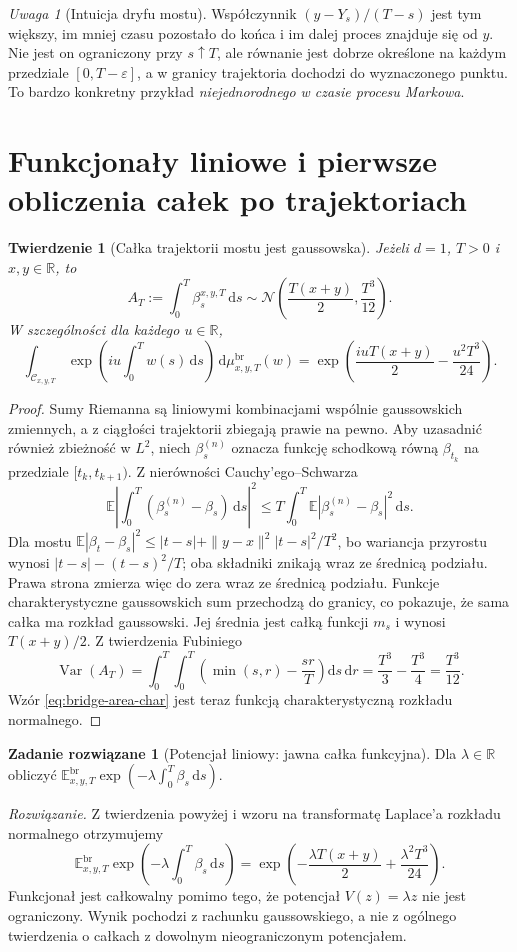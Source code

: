 \documentclass[11pt,a4paper,oneside]{report}
\numberwithin{equation}{chapter}
\theoremstyle{plain}
\newtheorem{twierdzenie}{Twierdzenie}[chapter]
\theoremstyle{definition}
\newtheorem{zadanie}{Zadanie rozwiązane}[chapter]
\theoremstyle{remark}
\newtheorem{uwaga}{Uwaga}[chapter]
\newcommand{\R}{\mathbb{R}}
\newcommand{\E}{\mathbb{E}}
\newcommand{\Var}{\operatorname{Var}}
\newcommand{\calC}{\mathcal{C}}
\newcommand{\dd}{\mathrm{d}}
\newcommand{\Normal}{\mathcal{N}}
\begin{document}
\begin{uwaga}[Intuicja dryfu mostu]
Współczynnik $(y-Y_s)/(T-s)$ jest tym większy, im
mniej czasu pozostało do końca i im dalej proces
znajduje się od $y$. Nie jest on ograniczony przy
$s\uparrow T$, ale równanie jest dobrze określone
na każdym przedziale $[0,T-\varepsilon]$, a w granicy
trajektoria dochodzi do wyznaczonego punktu.
To bardzo konkretny przykład \emph{niejednorodnego
w czasie procesu Markowa}.
\end{uwaga}

\section{Funkcjonały liniowe i pierwsze obliczenia całek po trajektoriach}

\begin{twierdzenie}[Całka trajektorii mostu jest gaussowska]
\label{th:bridge-integrated}
Jeżeli $d=1$, $T>0$ i $x,y\in\R$, to
\[
 A_T:=\int_0^T\beta_s^{x,y,T}\,\dd s
 \sim\Normal\!\left(\frac{T(x+y)}2,\frac{T^3}{12}\right).
\]
W szczególności dla każdego $u\in\R$,
\[
 \int_{\calC_{x,y,T}}\exp\left(iu\int_0^Tw(s)\,\dd s\right)
     \,\dd\mu_{x,y,T}^{\mathrm{br}}(w)
 =\exp\left(\frac{iuT(x+y)}2-\frac{u^2T^3}{24}\right).
 \tag{15.6}\label{eq:bridge-area-char}
\]
\end{twierdzenie}
\begin{proof}
Sumy Riemanna są liniowymi kombinacjami wspólnie
gaussowskich zmiennych, a z ciągłości trajektorii zbiegają
prawie na pewno. Aby uzasadnić również zbieżność w $L^2$,
niech $\beta^{(n)}_s$ oznacza funkcję schodkową równą
$\beta_{t_k}$ na przedziale $[t_k,t_{k+1})$.
Z nierówności Cauchy'ego--Schwarza
\[
\E\left|\int_0^T(\beta^{(n)}_s-\beta_s)\,\dd s\right|^2
\le T\int_0^T\E|\beta^{(n)}_s-\beta_s|^2\,\dd s.
\]
Dla mostu
$\E|\beta_t-\beta_s|^2\le |t-s|+
\|y-x\|^2|t-s|^2/T^2$,
bo wariancja przyrostu wynosi
$|t-s|-(t-s)^2/T$; oba składniki znikają wraz
ze średnicą podziału. Prawa strona
zmierza więc do zera wraz ze średnicą podziału. Funkcje
charakterystyczne gaussowskich sum przechodzą do granicy,
co pokazuje, że sama całka ma rozkład gaussowski.
Jej średnia jest całką funkcji $m_s$ i wynosi
$T(x+y)/2$. Z twierdzenia Fubiniego
\[
 \Var(A_T)=\int_0^T\!\int_0^T
 \left(\min(s,r)-\frac{sr}{T}\right)\dd s\,\dd r
 =\frac{T^3}{3}-\frac{T^3}{4}=\frac{T^3}{12}.
\]
Wzór \eqref{eq:bridge-area-char} jest teraz funkcją
charakterystyczną rozkładu normalnego.
\end{proof}

\begin{zadanie}[Potencjał liniowy: jawna całka funkcyjna]
Dla $\lambda\in\R$ obliczyć
$\E_{x,y,T}^{\mathrm{br}}
\exp(-\lambda\int_0^T\beta_s\,\dd s)$.

\emph{Rozwiązanie.} Z twierdzenia powyżej i wzoru na
transformatę Laplace'a rozkładu normalnego otrzymujemy
\[
 \E_{x,y,T}^{\mathrm{br}}
  \exp\!\left(-\lambda\int_0^T\beta_s\,\dd s\right)
 =\exp\left(-\frac{\lambda T(x+y)}2
           +\frac{\lambda^2T^3}{24}\right).
\]
Funkcjonał jest całkowalny pomimo tego, że potencjał
$V(z)=\lambda z$ nie jest ograniczony. Wynik pochodzi
z rachunku gaussowskiego, a nie z ogólnego twierdzenia
o całkach z dowolnym nieograniczonym potencjałem.
\end{zadanie}
\end{document}
